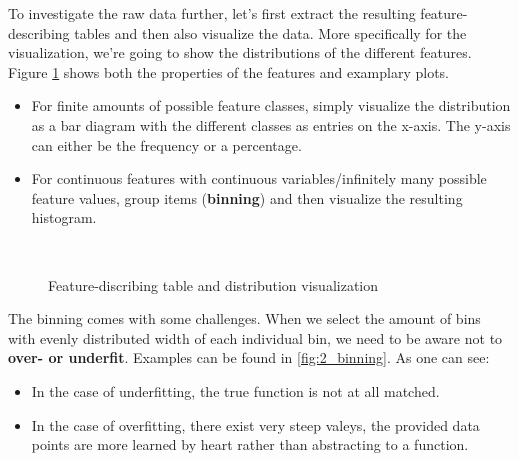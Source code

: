 To investigate the raw data further, let's first extract the resulting feature-describing tables and then also visualize the data. More specifically for the visualization, we're going to show the distributions of the different features. Figure \ref{fig:2_distr_visualization} shows both the properties of the features and examplary plots.
\begin{itemize}
  \item For finite amounts of possible feature classes, simply visualize the distribution as a bar diagram with the different classes as entries on the x-axis. The y-axis can either be the frequency or a percentage.
  \item For continuous features with continuous variables/infinitely many possible feature values, group items (\textbf{binning}) and then visualize the resulting histogram.
\end{itemize}

\begin{figure}[H]
  \centering
  \\\vspace*{0.25cm}
  \caption{Feature-discribing table and distribution visualization}
  \label{fig:2_distr_visualization}
\end{figure}

The binning comes with some challenges. When we select the amount of bins with evenly distributed width of each individual bin, we need to be aware not to \textbf{over- or underfit}. Examples can be found in \ref{fig:2_binning}. As one can see:
\begin{itemize}
  \item In the case of underfitting, the true function is not at all matched.
  \item In the case of overfitting, there exist very steep valeys, the provided data points are more learned by heart rather than abstracting to a function.
\end{itemize}

